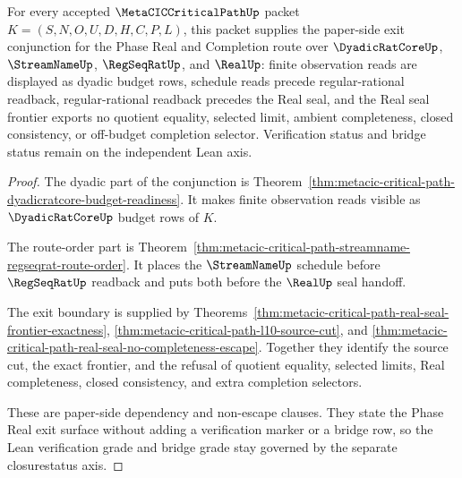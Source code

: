 \begin{theorem}
\label{thm:metacic-critical-path-phase-real-exit-conjunction}
For every accepted $\MetaCICCriticalPathUp$ packet $K=(S,N,O,U,D,H,C,P,L)$, this packet supplies the paper-side exit conjunction for the Phase Real and Completion route over $\DyadicRatCoreUp$, $\StreamNameUp$, $\RegSeqRatUp$, and $\RealUp$: finite observation reads are displayed as dyadic budget rows, schedule reads precede regular-rational readback, regular-rational readback precedes the Real seal, and the Real seal frontier exports no quotient equality, selected limit, ambient completeness, closed consistency, or off-budget completion selector. Verification status and bridge status remain on the independent Lean axis.
\end{theorem}
\begin{proof}
The dyadic part of the conjunction is Theorem~\ref{thm:metacic-critical-path-dyadicratcore-budget-readiness}. It makes finite observation reads visible as $\DyadicRatCoreUp$ budget rows of $K$.

The route-order part is Theorem~\ref{thm:metacic-critical-path-streamname-regseqrat-route-order}. It places the $\StreamNameUp$ schedule before $\RegSeqRatUp$ readback and puts both before the $\RealUp$ seal handoff.

The exit boundary is supplied by Theorems~\ref{thm:metacic-critical-path-real-seal-frontier-exactness}, \ref{thm:metacic-critical-path-l10-source-cut}, and \ref{thm:metacic-critical-path-real-seal-no-completeness-escape}. Together they identify the source cut, the exact frontier, and the refusal of quotient equality, selected limits, Real completeness, closed consistency, and extra completion selectors.

These are paper-side dependency and non-escape clauses. They state the Phase Real exit surface without adding a verification marker or a bridge row, so the Lean verification grade and bridge grade stay governed by the separate closurestatus axis.
\end{proof}

